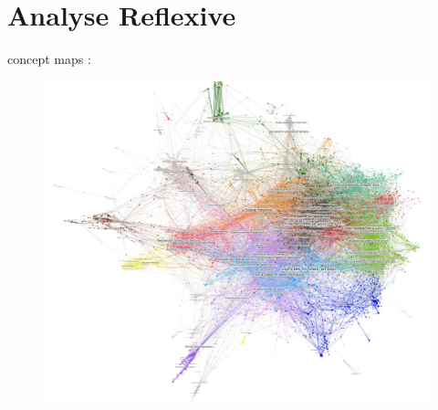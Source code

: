

\chapter{Analyse Reflexive}




\label{app:reflexivity} %








concept maps : \cite{novak2008theory}







\begin{figure}
	\includegraphics[width=\textwidth]{Figures/Final/F-reflexivity-citnw.jpg}
\end{figure}



